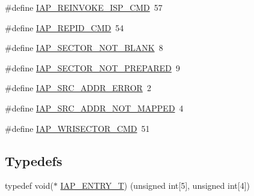 \begin{DoxyCompactItemize}
\#define \hyperlink{group__COMMON__IAP_gad1f3638abcb5134b6fb6aceb67a4bb2c}{I\+A\+P\+\_\+\+R\+E\+I\+N\+V\+O\+K\+E\+\_\+\+I\+S\+P\+\_\+\+C\+MD}~57
\item 
\#define \hyperlink{group__COMMON__IAP_gae385db2542e6b2c8b8417cf1b929fcb1}{I\+A\+P\+\_\+\+R\+E\+P\+I\+D\+\_\+\+C\+MD}~54
\item 
\#define \hyperlink{group__COMMON__IAP_ga19b046ec9c03aa0276a9cbe409eb3f04}{I\+A\+P\+\_\+\+S\+E\+C\+T\+O\+R\+\_\+\+N\+O\+T\+\_\+\+B\+L\+A\+NK}~8
\item 
\#define \hyperlink{group__COMMON__IAP_ga8600f9e930f1dee5d67a2bc11efcde63}{I\+A\+P\+\_\+\+S\+E\+C\+T\+O\+R\+\_\+\+N\+O\+T\+\_\+\+P\+R\+E\+P\+A\+R\+ED}~9
\item 
\#define \hyperlink{group__COMMON__IAP_gaad19f900fbc28ee51d3e0138a88a446b}{I\+A\+P\+\_\+\+S\+R\+C\+\_\+\+A\+D\+D\+R\+\_\+\+E\+R\+R\+OR}~2
\item 
\#define \hyperlink{group__COMMON__IAP_ga8d15cbc501933748afbe786c587e74f9}{I\+A\+P\+\_\+\+S\+R\+C\+\_\+\+A\+D\+D\+R\+\_\+\+N\+O\+T\+\_\+\+M\+A\+P\+P\+ED}~4
\item 
\#define \hyperlink{group__COMMON__IAP_ga9eb15375e6dd4de560a7d43b4483a293}{I\+A\+P\+\_\+\+W\+R\+I\+S\+E\+C\+T\+O\+R\+\_\+\+C\+MD}~51
\end{DoxyCompactItemize}
\subsection*{Typedefs}
\begin{DoxyCompactItemize}
\item 
typedef void($\ast$ \hyperlink{group__COMMON__IAP_ga07176e9ce6963e57318fa8c127b4f611}{I\+A\+P\+\_\+\+E\+N\+T\+R\+Y\+\_\+T}) (unsigned int\mbox{[}5\mbox{]}, unsigned int\mbox{[}4\mbox{]})
\end{DoxyCompactItemize}
